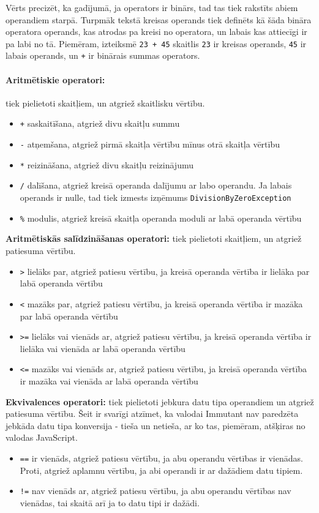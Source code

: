 \documentclass[12pt,a4paper]{report}
\begin{document}
Vērts precizēt, ka gadījumā, ja operators ir binārs, tad tas tiek rakstīts abiem operandiem starpā. Turpmāk tekstā kreisas operands tiek definēts kā šāda bināra operatora operands, kas atrodas pa kreisi no operatora, un labais kas attiecīgi ir pa labi no tā. Piemēram, izteiksmē \texttt{23 + 45} skaitlis \texttt{23} ir kreisas operands, \texttt{45} ir labais operands, un \texttt{+} ir binārais summas operators. \\

\paragraph{Aritmētiskie operatori:} tiek pielietoti skaitļiem, un atgriež skaitlisku vērtību.

\begin{itemize}
  \item \texttt{+} saskaitīšana, atgriež divu skaitļu summu
  \item \texttt{-} atņemšana, atgriež pirmā skaitļa vērtību mīnus otrā skaitļa vērtību
  \item \texttt{*} reizināšana, atgriež divu skaitļu reizinājumu
  \item \texttt{/} dalīšana, atgriež kreisā operanda dalījumu ar labo operandu. Ja labais operands ir nulle, tad tiek izmests izņēmums \texttt{DivisionByZeroException}
  \item \texttt{\%} modulis, atgriež kreisā skaitļa operanda moduli ar labā operanda vērtību
\end{itemize}

\textbf{Aritmētiskās salīdzināšanas operatori:} tiek pielietoti skaitļiem, un atgriež patiesuma vērtību. 
\begin{itemize}
  \item \texttt{>} lielāks par, atgriež patiesu vērtību, ja kreisā operanda vērtība ir lielāka par labā operanda vērtību
  \item \texttt{<} mazāks par, atgriež patiesu vērtību, ja kreisā operanda vērtība ir mazāka par labā operanda vērtību
  \item \texttt{>=} lielāks vai vienāds ar, atgriež patiesu vērtību, ja kreisā operanda vērtība ir lielāka vai vienāda ar labā operanda vērtību
  \item \texttt{<=} mazāks vai vienāds ar, atgriež patiesu vērtību, ja kreisā operanda vērtība ir mazāka vai vienāda ar labā operanda vērtību
\end{itemize}

\textbf{Ekvivalences operatori:} tiek pielietoti jebkura datu tipa operandiem un atgriež patiesuma vērtību. Šeit ir svarīgi atzīmet, ka valodai Immutant nav paredzēta jebkāda datu tipa konversija - tieša un netieša, ar ko tas, piemēram, atšķiras no valodas JavaScript\cite{ecma-262}. 
\begin{itemize}
  \item \texttt{==} ir vienāds, atgriež patiesu vērtību, ja abu operandu vērtības ir vienādas. Proti, atgriež aplamnu vērtību, ja abi operandi ir ar dažādiem datu tipiem.
  \item \texttt{!=} nav vienāds ar, atgriež patiesu vērtību, ja abu operandu vērtības nav vienādas, tai skaitā arī ja to datu tipi ir dažādi.
\end{itemize}
\end{document}

